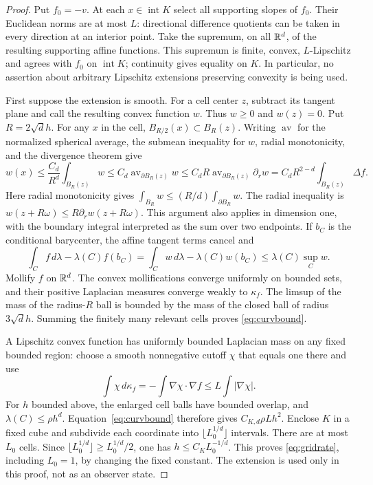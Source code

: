 \begin{proof}
Put $f_0=-v$. At each $x\in\operatorname{int}K$ select all supporting slopes of $f_0$. Their Euclidean norms are at most $L$: directional difference quotients can be taken in every direction at an interior point. Take the supremum, on all $\mathbb R^d$, of the resulting supporting affine functions. This supremum is finite, convex, $L$-Lipschitz and agrees with $f_0$ on $\operatorname{int}K$; continuity gives equality on $K$. In particular, no assertion about arbitrary Lipschitz extensions preserving convexity is being used.

First suppose the extension is smooth. For a cell center $z$, subtract its tangent plane and call the resulting convex function $w$. Thus $w\ge0$ and $w(z)=0$. Put $R=2\sqrt d h$. For any $x$ in the cell, $B_{R/2}(x)\subset B_R(z)$. Writing $\operatorname{av}$ for the normalized spherical average, the submean inequality for $w$, radial monotonicity, and the divergence theorem give
\[
 w(x)\le \frac{C_d}{R^d}\int_{B_R(z)}w
 \le C_d\operatorname{av}_{\partial B_R(z)}w
 \le C_d R\operatorname{av}_{\partial B_R(z)}\partial_r w
 =C_dR^{2-d}\int_{B_R(z)}\Delta f.
\]
Here radial monotonicity gives $\int_{B_R}w\le (R/d)\int_{\partial B_R}w$.
The radial inequality is $w(z+R\omega)\le R\partial_r w(z+R\omega)$. This argument also applies in dimension one, with the boundary integral interpreted as the sum over two endpoints. If $b_C$ is the conditional barycenter, the affine tangent terms cancel and
\[
 \int_Cf\,d\lambda-\lambda(C)f(b_C)
 =\int_Cw\,d\lambda-\lambda(C)w(b_C)
 \le\lambda(C)\sup_Cw.
\]
Mollify $f$ on $\mathbb R^d$. The convex mollifications converge uniformly on bounded sets, and their positive Laplacian measures converge weakly to $\kappa_f$. The limsup of the mass of the radius-$R$ ball is bounded by the mass of the closed ball of radius $3\sqrt d h$. Summing the finitely many relevant cells proves \eqref{eq:curvbound}.

A Lipschitz convex function has uniformly bounded Laplacian mass on any fixed bounded region: choose a smooth nonnegative cutoff $\chi$ that equals one there and use
\[
 \int\chi\,d\kappa_f=-\int\nabla\chi\cdot\nabla f
 \le L\int|\nabla\chi|.
\]
For $h$ bounded above, the enlarged cell balls have bounded overlap, and $\lambda(C)\le\rho h^d$. Equation~\eqref{eq:curvbound} therefore gives $C_{K,d}\rho Lh^2$. Enclose $K$ in a fixed cube and subdivide each coordinate into $\lfloor L_0^{1/d}\rfloor$ intervals. There are at most $L_0$ cells. Since $\lfloor L_0^{1/d}\rfloor\ge L_0^{1/d}/2$, one has $h\le C_K L_0^{-1/d}$. This proves \eqref{eq:gridrate}, including $L_0=1$, by changing the fixed constant. The extension is used only in this proof, not as an observer state.
\end{proof}

